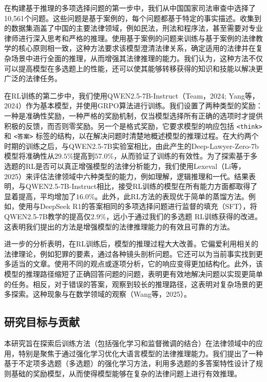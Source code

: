 \documentclass{pkuthesis}
\begin{document}
在构建基于推理的多项选择问题的第一步中，我们从中国国家司法审查中选择了10,561个问题。这些问题是基于案例的，每个问题都基于特定的事实描述。收集到的数据集涵盖了中国的主要法律领域，例如民法，刑法和程序法，甚至需要对专业律师进行深入思考和严格的推理。使用基于案例的问题来训练与基于案例的法律教学的核心原则相一致，这种方法要求该模型澄清法律关系，确定适用的法律并在复杂场景中进行全面的推理，从而增强其法律推理的能力。我们认为，这种方法不仅可以提高模型在多选题上的性能，还可以使其能够转移获得的知识和技能以解决更广泛的法律任务。

在RL训练的第二步中，我们使用QWEN2.5-7B-Instruct（Team，2024; Yang等，2024）作为基本模型，并使用GRPO算法进行训练。我们设置了两种类型的奖励：一种是准确性奖励，一种严格的奖励机制，仅当模型选择所有正确的选项时才提供积极的反馈，而否则零奖励。另一个是格式奖励，它要求模型的响应包括 \texttt{<think>} 和 \texttt{<答案>} 标签的结构，以在解决问题时清楚地概述模型的推理过程。在大约两个时期的训练之后，与QWEN2.5-7B实验室相比，由此产生的Deep-Lawyer-Zero-7b模型将准确性从$29.5\%$提高到$57.0\%$，从而验证了训练的有效性。为了探索基于多选题的RL是否可以真正增强模型的法律分析能力，我们使用Lexeval（Li等，2025）来评估法律领域中六种类型的能力，例如理解，逻辑推理和一代。结果表明，与QWEN2.5-7B-Instruct相比，接受RL训练的模型在所有能力方面都取得了显着提高，平均增加了$16.0\%$。此外，此RL方法的表现优于简单的蒸馏方法。例如，使用与DeepSeek R1的答案相同的多项选择问题进行监督的填充（SFT），将QWEN2.5-7B教学的提高仅$2.9\%$，远小于通过我们的多选题 RL训练获得的改进。这表明我们提出的方法是增强模型的法律推理能力的有效且可靠的方法。

进一步的分析表明，在RL训练后，模型的推理过程大大改善。它偏爱利用相关的法律理论，例如犯罪的要素，通过各种镜头剖析问题。它还可以为当前事实找到更多适当的文章。使用不同的观点或逐项分析，它的响应变得更加结构化。此外，该模型的推理路径缩短了正确回答问题的问题，表明更有效地解决问题以实现更简单的任务。相反，对于错误的答案，观察到较长的推理路径，这表明对复杂场景的更多探索。这种现象与在数学领域的观察（Wang等，2025）。

\subsection{研究目标与贡献}
本研究旨在探索后训练方法（包括强化学习和监督微调的结合）在法律领域中的应用，特别是聚焦于通过强化学习优化大语言模型的法律推理能力。我们提出了一种基于不定项多选题（多选题）的强化学习方法，利用多选题的多答案特性设计了规则基础的奖励模型，从而使得模型能够在复杂的法律问题上进行有效推理。
\end{document}
